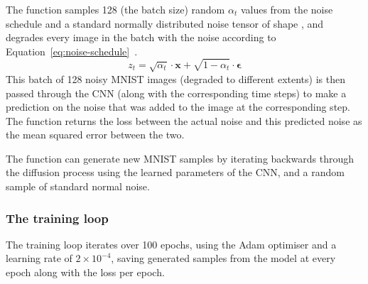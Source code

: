 The  function samples 128 (the batch size) random $\alpha_{t}$ values from the noise schedule and
a standard normally distributed noise tensor of shape , and degrades every image in the batch
with the noise according to Equation~\eqref{eq:noise-schedule}~\cite{prince}.
\begin{equation}\label{eq:noise-schedule}
    z_{t} = \sqrt{\alpha_{t}} \cdot \mathbf{x} + \sqrt{1 - \alpha_{t}} \cdot \mathbf{\epsilon}
\end{equation}
This batch of 128 noisy MNIST images (degraded to different extents) is then passed through the CNN (along with the
corresponding time steps) to make a prediction on the noise that was added to the image at the corresponding step.
The function returns the loss between the actual noise and this predicted noise as the mean squared error between the
two.

The  function can generate new MNIST samples by iterating backwards through the diffusion process
using the learned parameters of the CNN, and a random sample of standard normal noise.

\subsubsection{The training loop}\label{subsubsec:training-loop}
The training loop iterates over 100 epochs, using the Adam optimiser and a learning rate of $2 \times 10^{-4}$,
saving generated samples from the model at every epoch along with the loss per epoch.
